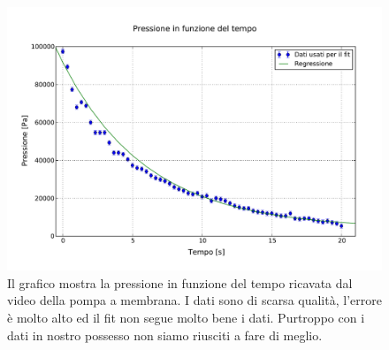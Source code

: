 \begin{figure}[h!]
    \includegraphics[width=140mm]{graph2.pdf}
    \caption{Il grafico mostra la pressione in funzione del tempo ricavata dal video della pompa a membrana. I dati sono di scarsa qualità, l'errore è molto alto
	ed il fit non segue molto bene i dati. Purtroppo con i dati in nostro possesso non siamo riusciti a fare di meglio.}
    \label{fig:graph2}
\end{figure}
